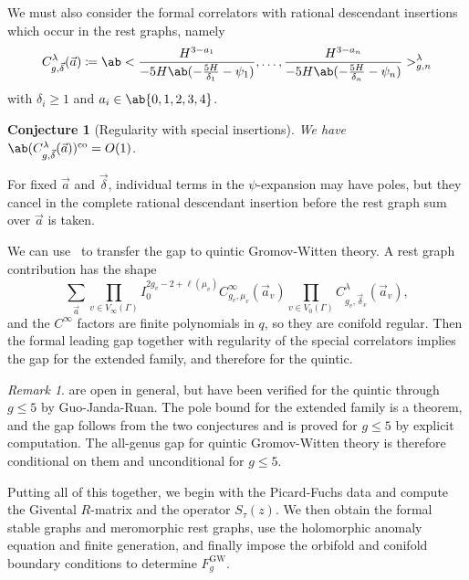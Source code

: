 \documentclass{amsart}
\newtheorem{conj}[thm]{Conjecture}
\theoremstyle{definition}
\theoremstyle{remark}
\newtheorem{rmk}[thm]{Remark}
\theoremstyle{plain}
\theoremstyle{definition}
\theoremstyle{remark}
\newcommand{\mr}[1]{\mathrm{#1}}
\newcommand{\1}{\mathbf{1}}
\newcommand{\2}{\mathbf{2}}
\newcommand{\3}{\mathbf{3}}
\begin{document}
We must also consider the formal correlators with rational descendant insertions which occur in the rest graphs, namely
\[ C^{\lambda}_{g,\vec{\delta}}(\vec{a}) \coloneqq \ab< \frac{H^{3-a_1}}{-5H\ab(-\frac{5H}{\delta_1}-\psi_1)}, \ldots, \frac{H^{3-a_n}}{-5H\ab(-\frac{5H}{\delta_n}-\psi_n)}>^{\lambda}_{g,n} \]
with \(\delta_i \geq 1\) and \(a_i \in \ab\{0,1,2,3,4\}\).

\begin{conj}[Regularity with special insertions]%
\label{conj:special correlator regularity}
    We have \(\ab(C^{\lambda}_{g,\vec{\delta}}(\vec{a}))^{\mr{co}} = O(1)\).
\end{conj}

For fixed \(\vec{a}\) and \(\vec{\delta}\), individual terms in the \(\psi\)-expansion may have poles, but they cancel in the complete rational descendant insertion before the rest graph sum over \(\vec{a}\) is taken.

We can use~ to transfer the gap to quintic Gromov-Witten theory. A rest graph contribution has the shape
\[ \sum_{\vec{a}} \prod_{v \in V_{\infty}(\Gamma)}I_0^{2g_v-2+\ell(\mu_v)}C^{\infty}_{g_v,\mu_v}(\vec{a}_v)\prod_{v\in V_0(\Gamma)}C^{\lambda}_{g_v,\vec{\delta}_v}(\vec{a}_v), \]
and the \(C^{\infty}\) factors are finite polynomials in \(q\), so they are conifold regular. Then the formal leading gap together with regularity of the special correlators implies the gap for the extended family, and therefore for the quintic.

\begin{rmk}
     are open in general, but have been verified for the quintic through \(g \leq 5\) by Guo-Janda-Ruan. The pole bound for the extended family is a theorem, and the gap follows from the two conjectures and is proved for \(g \leq 5\) by explicit computation. The all-genus gap for quintic Gromov-Witten theory is therefore conditional on them and unconditional for \(g \leq 5\).
\end{rmk}

Putting all of this together, we begin with the Picard-Fuchs data and compute the Givental \(R\)-matrix and the operator \(S_{\tau}(z)\). We then obtain the formal stable graphs and meromorphic rest graphs, use the holomorphic anomaly equation and finite generation, and finally impose the orbifold and conifold boundary conditions to determine \(F_g^{\mr{GW}}\).
\end{document}

